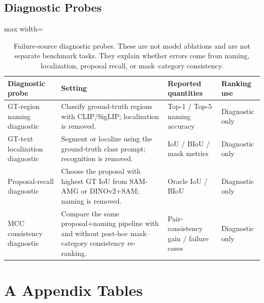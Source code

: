 \documentclass[11pt,a4paper]{article}
\begin{document}
\subsection{Diagnostic Probes}

\begin{table}[H]
\centering
\scriptsize
\caption{Failure-source diagnostic probes. These are not model ablations and are not separate benchmark tasks. They explain whether errors come from naming, localization, proposal recall, or mask--category consistency.}
\label{tab:diagnostic-probes}
\begin{adjustbox}{max width=\textwidth}
\begin{tabular}{p{} p{} p{} p{}}
\toprule
Diagnostic probe & Setting & Reported quantities & Ranking use \\
\midrule
GT-region naming diagnostic & Classify ground-truth regions with CLIP/SigLIP; localization is removed. & Top-1 / Top-5 naming accuracy & Diagnostic only \\
GT-text localization diagnostic & Segment or localize using the ground-truth class prompt; recognition is removed. & IoU / BIoU / mask metrics & Diagnostic only \\
Proposal-recall diagnostic & Choose the proposal with highest GT IoU from SAM-AMG or DINOv2+SAM; naming is removed. & Oracle IoU / BIoU & Diagnostic only \\
MCC consistency diagnostic & Compare the same proposal+naming pipeline with and without post-hoc mask--category consistency re-ranking. & Pair-consistency gain / failure cases & Diagnostic only \\
\bottomrule
\end{tabular}
\end{adjustbox}
\end{table}

\clearpage

\section*{A Appendix Tables}
\end{document}
